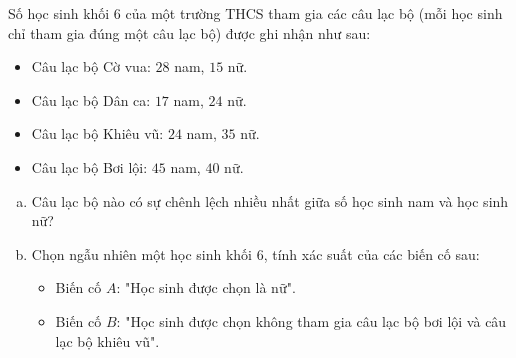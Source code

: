 \begin{bt}%
Số học sinh khối 6 của một trường THCS tham gia các câu lạc bộ (mỗi học sinh chỉ tham gia đúng một câu lạc bộ) được ghi nhận như sau:
\begin{itemize}
	\item Câu lạc bộ Cờ vua: $28$ nam, $15$ nữ.
	\item Câu lạc bộ Dân ca: $17$ nam, $24$ nữ.
	\item Câu lạc bộ Khiêu vũ: $24$ nam, $35$ nữ.
	\item Câu lạc bộ Bơi lội: $45$ nam, $40$ nữ.
\end{itemize}
\begin{enumerate}[a)]
	\item Câu lạc bộ nào có sự chênh lệch nhiều nhất giữa số học sinh nam và học sinh nữ?
	\item Chọn ngẫu nhiên một học sinh khối 6, tính xác suất của các biến cố sau:
	\begin{itemize}
		\item Biến cố $A$: "Học sinh được chọn là nữ".
		\item Biến cố $B$: "Học sinh được chọn không tham gia câu lạc bộ bơi lội và câu lạc bộ khiêu vũ".
	\end{itemize}
\end{enumerate}
\end{bt}
